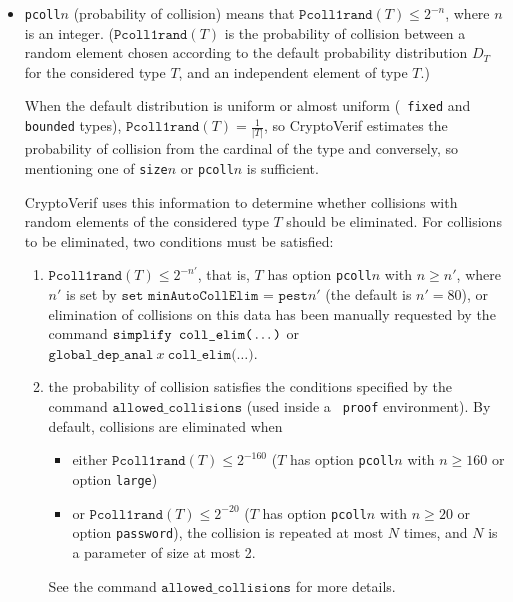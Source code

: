 \begin{itemize}
\begin{itemize}
\item \texttt{pcoll$n$} ({\sc p}robability of {\sc coll}ision) means that $\texttt{Pcoll1rand}(T) \leq 2^{-n}$, where $n$ is an integer.  ($\texttt{Pcoll1rand}(T)$ is the
  probability of collision between a random element chosen according
  to the default probability distribution $D_T$ for the considered
  type $T$, and an independent element of type $T$.)

  When the default distribution is uniform or almost uniform ({\tt
    fixed} and {\tt bounded} types),
  $\texttt{Pcoll1rand}(T) = \frac{1}{|T|}$, so CryptoVerif estimates
  the probability of collision from the cardinal of the type and
  conversely, so mentioning one of \texttt{size$n$} or
  \texttt{pcoll$n$} is sufficient.

CryptoVerif uses this information to determine whether collisions 
with random elements of the considered type $T$ should be eliminated.
For collisions to be eliminated, two conditions must be satisfied:
\begin{enumerate}

\item $\texttt{Pcoll1rand}(T) \leq 2^{-n'}$, that is, $T$ has option
  \texttt{pcoll$n$} with $n \geq n'$, where
$n'$ is set by $\texttt{set minAutoCollElim = pest}n'$ 
(the default is $n' = 80$),
or elimination of collisions
on this data has been manually requested by the command 
$\texttt{simplify coll\string_elim(}\ldots\texttt{)}$
or $\texttt{global\_dep\_anal}\ x\ \texttt{coll\_elim(}\ldots\texttt{)}$.

\sloppy

\item the probability of collision satisfies the conditions specified
  by the command $\texttt{allowed\_collisions}$ (used inside a {\tt
    proof} environment).  By default, collisions are eliminated when
  \begin{itemize}
\item either $\texttt{Pcoll1rand}(T) \leq 2^{-160}$ ($T$ has option
  \texttt{pcoll$n$} with $n \geq 160$ or option \texttt{large})
\item or
  $\texttt{Pcoll1rand}(T) \leq 2^{-20}$ ($T$ has option
  \texttt{pcoll$n$} with $n \geq 20$ or option \texttt{password}), the
  collision is repeated at most $N$ times, and $N$ is a parameter of
  size at most 2.  
\end{itemize}
See the command $\texttt{allowed\_collisions}$ for more details.
\fussy

\end{enumerate}


\end{itemize}
\end{itemize}
